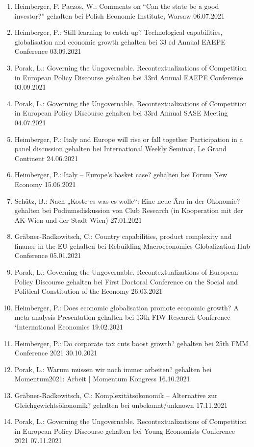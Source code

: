 \begin{enumerate}
	\item Heimberger, P. Paczos, W.: Comments on “Can the state be a good investor?” gehalten bei Polish Economic Institute, Warsaw 06.07.2021
	\item Heimberger, P.: Still learning to catch-up? Technological capabilities, globalisation and economic growth gehalten bei 33 rd Annual EAEPE Conference 03.09.2021
	\item Porak, L.: Governing the Ungovernable. Recontextualizations of Competition in European Policy Discourse gehalten bei 33rd Annual EAEPE Conference 03.09.2021
	\item Porak, L.: Governing the Ungovernable. Recontextualizations of Competition in European Policy Discourse gehalten bei 33rd Annual SASE Meeting 04.07.2021
	\item Heimberger, P.: Italy and Europe will rise or fall together Participation in a panel discussion gehalten bei International Weekly Seminar, Le Grand Continent 24.06.2021
	\item Heimberger, P.: Italy -- Europe’s basket case? gehalten bei Forum New Economy 15.06.2021
	\item Schütz, B.: Nach „Koste es was es wolle“: Eine neue Ära in der Ökonomie? gehalten bei Podiumsdiskussion von Club Research (in Kooperation mit der AK-Wien und der Stadt Wien) 27.01.2021
	\item Gräbner-Radkowitsch, C.: Country capabilities, product complexity and finance in the EU gehalten bei Rebuilding Macroeconomics Globalization Hub Conference 05.01.2021
	\item Porak, L.: Governing the Ungovernable. Recontextualizations of European Policy Discourse gehalten bei First Doctoral Conference on the Social and Political Constitution of the Economy 26.03.2021
	\item Heimberger, P.: Does economic globalisation promote economic growth? A meta analysis Presentation gehalten bei 13th FIW-Research Conference ‘International Economics 19.02.2021
	\item Heimberger, P.: Do corporate tax cuts boost growth? gehalten bei 25th FMM Conference 2021 30.10.2021
	\item Porak, L.: Warum müssen wir noch immer arbeiten? gehalten bei Momentum2021: Arbeit | Momentum Kongress 16.10.2021
	\item Gräbner-Radkowitsch, C.: Komplexitätsökonomik – Alternative zur Gleichgewichtsökonomik? gehalten bei unbekannt/unknown 17.11.2021
	\item Porak, L.: Governing the Ungovernable. Recontextualizations of Competition in European Policy Discourse gehalten bei Young Economists Conference 2021 07.11.2021

\end{enumerate}
